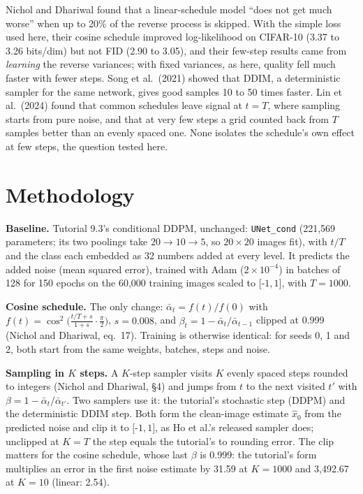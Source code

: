 \documentclass[10pt,a4paper,twocolumn]{article}
\begin{document}
Nichol and Dhariwal found that a linear-schedule model
``does not get much worse'' when up to 20\% of the reverse process is skipped. With the simple
loss used here, their cosine schedule improved log-likelihood on CIFAR-10 (3.37 to 3.26 bits/dim)
but not FID (2.90 to 3.05), and their few-step results came from \emph{learning} the
reverse variances; with fixed variances, as here, quality fell much faster with fewer steps.
Song et al.\ (2021) showed that DDIM, a deterministic sampler for the same network, gives
good samples 10 to 50 times faster. Lin et al.\ (2024) found that common schedules leave
signal at $t = T$, where sampling starts from pure noise, and that at very few steps a grid counted
back from $T$ samples better than an evenly spaced one. None isolates the schedule's own effect
at few steps, the question tested here.

\section{Methodology}
\textbf{Baseline.} Tutorial 9.3's conditional DDPM, unchanged: \texttt{UNet\_cond} (221,569
parameters; its two poolings take $20 \to 10 \to 5$, so $20\times20$ images fit), with $t/T$ and
the class each embedded as 32 numbers added at every level. It predicts the added noise (mean
squared error), trained with Adam ($2\times10^{-4}$) in batches of 128 for 150 epochs on
the 60,000 training images scaled to $[$-$1, 1]$, with $T = 1000$.

\textbf{Cosine schedule.} The only change: $\bar\alpha_t = f(t)/f(0)$ with
$f(t) = \cos^2\!\big(\tfrac{t/T + s}{1 + s}\cdot\tfrac{\pi}{2}\big)$, $s = 0.008$, and
$\beta_t = 1 - \bar\alpha_t/\bar\alpha_{t-1}$ clipped at 0.999 (Nichol and Dhariwal, eq.~17).
Training is otherwise identical: for seeds 0, 1 and 2, both start from the same weights,
batches, steps and noise.

\textbf{Sampling in $K$ steps.} A $K$-step sampler visits $K$ evenly spaced steps rounded to
integers (Nichol and Dhariwal, \S4) and jumps from $t$ to the next visited $t'$ with
$\beta = 1 - \bar\alpha_t/\bar\alpha_{t'}$. Two samplers use it: the tutorial's stochastic step
(DDPM) and the deterministic DDIM step. Both form the clean-image estimate $\hat x_0$ from the
predicted noise and clip it to $[$-$1, 1]$, as Ho et al.'s released sampler does; unclipped at
$K = T$ the step equals the tutorial's to rounding error. The clip matters for the cosine schedule,
whose last $\beta$ is 0.999: the tutorial's form multiplies an error in the first noise estimate by
31.59 at $K = 1000$ and 3,492.67 at $K = 10$ (linear: 2.54).
\end{document}
